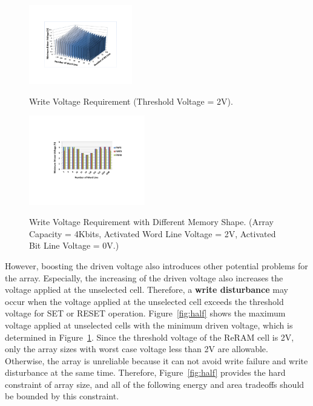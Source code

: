\begin{figure}%
\centering
  \includegraphics[width=0.4\textwidth]{./figures/worst_v3.pdf}\\
  \caption{Write Voltage Requirement (Threshold Voltage = 2V). }\label{fig:worst_v}
  \vspace{-10pt}
\end{figure}


\begin{figure}%
\centering
  \includegraphics[width=0.45\textwidth]{./figures/shape3.pdf}\\
  \caption{Write Voltage Requirement with Different Memory Shape. (Array Capacity = 4Kbits, Activated Word Line Voltage = 2V, Activated Bit Line Voltage = 0V.)}\label{fig:shape}
    \vspace{-10pt}
\end{figure}

However, boosting the driven voltage also introduces other potential problems for the array. Especially, the increasing of the driven voltage also increases the voltage applied at the unselected cell. Therefore, a
\textbf{write disturbance} may occur when the voltage applied at the
unselected cell exceeds the threshold voltage for SET or RESET operation. Figure~\ref{fig:half} shows the maximum voltage applied at
unselected cells with the minimum driven voltage, which is determined in
Figure~\ref{fig:worst_v}. Since the threshold voltage of the ReRAM cell is 2V, only the array sizes with worst case voltage less than 2V are allowable. Otherwise, the array is unreliable because it can not avoid write failure and write disturbance at the same time. Therefore, Figure~\ref{fig:half} provides the hard constraint of array size, and all of the following energy and area tradeoffs should be bounded by this constraint.

